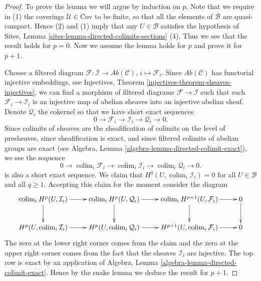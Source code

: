 \documentclass[10pt,a4paper]{amsart}
\theoremstyle{plain}
\theoremstyle{definition}
\theoremstyle{remark}
\numberwithin{equation}{subsection}
\def\colim{\mathop{\mathrm{colim}}\nolimits}
\begin{document}
\begin{proof}
To prove the lemma we will argue by induction on $p$.
Note that we require in (1) the coverings $\mathcal{U} \in \text{Cov}$
to be finite, so that all the elements of $\mathcal{B}$ are quasi-compact.
Hence (2) and (1) imply that any $U \in \mathcal{B}$ satisfies the hypothesis
of Sites, Lemma \ref{sites-lemma-directed-colimits-sections} (4).
Thus we see that the result holds for $p = 0$.
Now we assume the lemma holds for $p$ and prove it for $p + 1$.

\medskip\noindent
Choose a filtered diagram
$\mathcal{F} : \mathcal{I} \to \textit{Ab}(\mathcal{C})$,
$i \mapsto \mathcal{F}_i$.
Since $\textit{Ab}(\mathcal{C})$ has functorial injective embeddings, see
Injectives, Theorem \ref{injectives-theorem-sheaves-injectives},
we can find a morphism of filtered diagrams
$\mathcal{F} \to \mathcal{I}$
such that each $\mathcal{F}_i \to \mathcal{I}_i$ is an injective map of
abelian sheaves into an injective abelian sheaf. Denote $\mathcal{Q}_i$
the cokernel so that we have short exact sequences
$$
0 \to
\mathcal{F}_i \to
\mathcal{I}_i \to
\mathcal{Q}_i \to 0.
$$
Since colimits of sheaves are the sheafification of colimits on the level
of presheaves, since sheafification is exact, and since filtered
colimits of abelian groups are exact
(see Algebra, Lemma \ref{algebra-lemma-directed-colimit-exact}),
we see the sequence
$$
0 \to
\colim_i \mathcal{F}_i \to
\colim_i \mathcal{I}_i \to
\colim_i \mathcal{Q}_i \to 0.
$$
is also a short exact sequence. We claim that
$H^q(U, \colim_i \mathcal{I}_i) = 0$ for all $U \in \mathcal{B}$
and all $q \geq 1$. Accepting this claim
for the moment consider the diagram
$$
\xymatrix{
\colim_i H^p(U, \mathcal{I}_i) \ar[d] \ar[r] &
\colim_i H^p(U, \mathcal{Q}_i) \ar[d] \ar[r] &
\colim_i H^{p + 1}(U, \mathcal{F}_i) \ar[d] \ar[r] &
0 \ar[d] \\
H^p(U, \colim_i \mathcal{I}_i) \ar[r] &
H^p(U, \colim_i \mathcal{Q}_i) \ar[r] &
H^{p + 1}(U, \colim_i \mathcal{F}_i) \ar[r] &
0
}
$$
The zero at the lower right corner comes from the claim and the
zero at the upper right corner comes from the fact that the sheaves
$\mathcal{I}_i$ are injective.
The top row is exact by an application of
Algebra, Lemma \ref{algebra-lemma-directed-colimit-exact}.
Hence by the snake lemma we deduce the
result for $p + 1$.


\end{proof}
\end{document}
